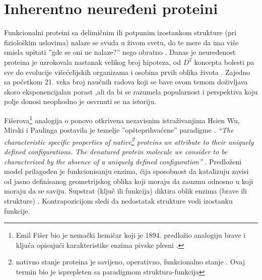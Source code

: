 
\chapter{Inherentno neuređeni proteini} %

\label{IDP} %


Funkcionalni proteini sa delimičnim ili potpunim izostankom strukture (pri
fiziološkim uslovima) nalaze se svuda u živom svetu, do te mere da ima više
smisla upitati ''gde se oni ne nalaze?'' nego obratno \parencite{uversky2016}.
Danas je neuređenost proteina je uzrokovala nastanak velikog broj hipoteza, od
$D^2$ koncepta bolesti \parencite{Uversky2008} pa sve do evolucije
višećelijskih organizama \parencite{Romero2006} i osobina prvih oblika života
\parencite{uversky2016, Trifonov2000}. Zajedno sa početkom 21. veka broj
naučnih radova koji se bave ovom temom doživljava skoro eksponencijalan
porast \parencite{oldfield2014},ali  da bi se razumela popularnost i 
perspektiva koju polje donosi neophodno je osvrnuti se na istoriju.

Fišerova\footnote{ Emil Fišer bio je nemački hemičar koji je 1894. predložio
analogiju brave i ključa opisujući karakteristike enzima pivske
plesni \parencite{dunker2001}.  } analogija o  ponovo
otkrivena nezavisnim istraživanjima Hsien Wu,  Mirski i Paulinga 
postavila je temelje ''opšteprihvaćene''
 paradigme \parencite{dunker2001}.
\textit{“The characteristic specific properties of native\footnote{ nativno stanje
  proteina je savijeno, operativno, funkcionalno stanje \parencite{dunker2001}.
Ovaj termin bio je isprepleten sa paradigmom struktura-funkcija} proteins we
attribute to their uniquely defined configurations. The denatured protein
molecule we consider to be characterized by the absence of a uniquely defined
configuration”} \parencite{MirskyPauling1936}. Predloženi model prilagođen je
funkcionisanju enzima, čija sposobnost da katalizuju zavisi od jasno
definisanog geometrijskog oblika koji moraju da zauzmu odnosno u koji moraju da
se saviju.  Supstrat (ključ ili funkcija) diktira oblik enzima (brave ili
strukture) \parencite{biology}.  Kontrapozicijom sledi da nedostatak strukture
vodi izostanku funkcije.

